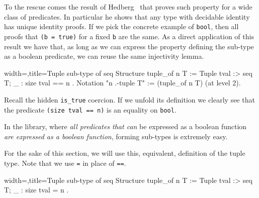 To the rescue comes the result of Hedberg~\cite{Hedberg}
that proves such property for a wide class of predicates.
In particular he shows that any type with decidable identity
has unique identity proofs.  If we pick the concrete example
of \lstinline/bool/, then all proofs that \lstinline/(b = true)/
for a fixed \lstinline/b/ are the same.
As a direct application of this result we have that, as long as we can
express the property defining the sub-type as a boolean predicate,
we can reuse the same injectivity lemma.

\begin{coq}{width=\textwidth,title=Tuple sub-type of seq}
Structure tuple_of n T :=  Tuple { tval :> seq T; _ : size tval == n }.
Notation "n .-tuple T" := (tuple_of n T) (at level 2).
\end{coq}

Recall the hidden \lstinline/is_true/ coercion.  If we unfold
its definition we clearly see that the predicate
\lstinline/(size tval == n)/ is an equality on \lstinline/bool/.

In the \mcbMC{} library, where \emph{all predicates that can} be
expressed as a boolean function \emph{are expressed as a boolean
function}, forming sub-types is extremely easy.

% 


For the sake of this section, we will use this, equivalent, definition
of the tuple type.  Note that we use \lstinline/=/ in place of
\lstinline/==/.

\begin{coq}{width=\textwidth,title=Tuple sub-type of seq}
Structure tuple_of n T :=  Tuple { tval :> seq T; _ : size tval = n }.
\end{coq}



